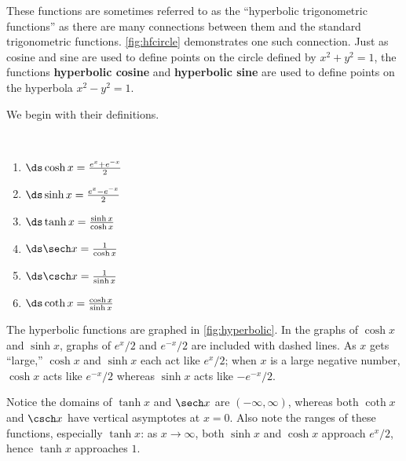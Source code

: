 These functions are sometimes referred to as the ``hyperbolic trigonometric functions'' as there are many connections between them and the standard trigonometric functions. \autoref{fig:hfcircle} demonstrates one such connection. Just as cosine and sine are used to define points on the circle defined by $x^2+y^2=1$, the functions \textbf{hyperbolic cosine} and \textbf{hyperbolic sine} are used to define points on the hyperbola $x^2-y^2=1$.

We begin with their definitions.

\begin{definition}\label{def:hyperbolic_functions}%
\mbox{}\\[-2\baselineskip]\parbox[t]{\linewidth}{%
\begin{multicols}{2}%
\begin{enumerate}
\item		$\ds \cosh x = \frac{e^x+e^{-x}}2$
\item		$\ds \sinh x = \frac{e^x-e^{-x}}2$
\item		$\ds \tanh x = \frac{\sinh x}{\cosh x}$
\item		$\ds \sech x = \frac{1}{\cosh x}$
\item		$\ds \csch x = \frac{1}{\sinh x}$
\item		$\ds \coth x = \frac{\cosh x}{\sinh x}$
\end{enumerate}
\end{multicols}}
\end{definition}

The hyperbolic functions are graphed in \autoref{fig:hyperbolic}. In the graphs of $\cosh x$ and $\sinh x$, graphs of $e^x/2$ and $e^{-x}/2$ are included with dashed lines. As $x$ gets ``large,'' $\cosh x$ and $\sinh x$ each act like $e^x/2$; when $x$ is a large negative number, $\cosh x$ acts like $e^{-x}/2$ whereas $\sinh x$ acts like $-e^{-x}/2$.


Notice the domains of $\tanh x$ and $\sech x$ are $(-\infty,\infty)$, whereas both $\coth x$ and $\csch x$ have vertical asymptotes at $x=0$. Also note the ranges of these functions, especially $\tanh x$: as $x\to\infty$, both $\sinh x$ and $\cosh x$ approach $e^x/2$, hence $\tanh x$ approaches $1$.

